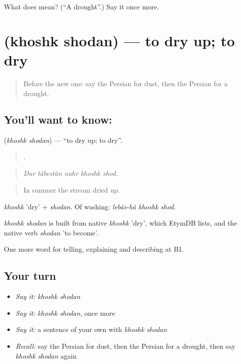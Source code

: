 \begin{tcolorbox}[breakable,colback=teal!4,colframe=teal!35!black,title={Before you move on}]
What does  mean? (\textquotedblleft{}A drought\textquotedblright{}.) Say it once more.
\end{tcolorbox}
\section[\texorpdfstring{\fa{خشک} \fa{شدن} (khoshk shodan)}{خشک شدن (khoshk shodan)}]{  (khoshk shodan) — to dry up; to dry}

\label{lesson:FA-C478-khoshk-shodan}



\begin{quote}
Before the new one: say the Persian for dust, then the Persian for a drought.
\end{quote}

\subsection*{You'll want to know:  }
\textbf{ } (\emph{khoshk shodan}) — \textquotedblleft{}to dry up; to dry\textquotedblright{}.

\begin{quote}
    .
\end{quote}

\begin{quote}
\emph{Dar tâbestân nahr khoshk shod.}
\end{quote}

\begin{quote}
In summer the stream dried up.
\end{quote}

\emph{khoshk} 'dry' + \emph{shodan}. Of washing: \emph{lebâs-hâ khoshk shod}.

\begin{cousinweb}
\emph{khoshk shodan} is built from native \emph{khoshk} 'dry', which EtymDB lists, and the native verb \emph{shodan} 'to become'.
\end{cousinweb}

\begin{grammarlens}[title={What you've built}]
One more word for telling, explaining and describing at B1.
\end{grammarlens}

\subsection*{Your turn}
\begin{itemize}
\raggedright
  \item \emph{Say it:} \emph{khoshk shodan}
  \item \emph{Say it:} \emph{khoshk shodan}, once more
  \item \emph{Say it:} a sentence of your own with \emph{khoshk shodan}
  \item \emph{Recall:} say the Persian for dust, then the Persian for a drought, then say \emph{khoshk shodan} again
\end{itemize}

